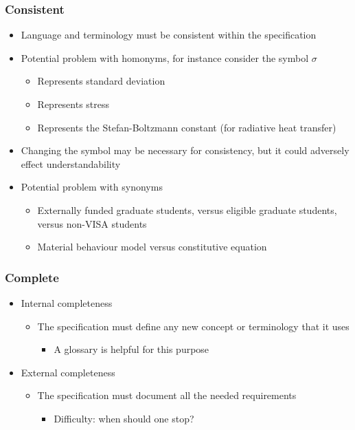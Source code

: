 \documentclass[t,12pt,numbers,fleqn]{beamer}
\begin{document}
\begin{frame}
\frametitle{Consistent}

\begin{itemize}

\item Language and terminology must be consistent within the specification
\item Potential problem with homonyms, for instance consider the symbol $\sigma$
\begin{itemize}
\item Represents standard deviation
\item Represents stress
\item Represents the Stefan-Boltzmann constant (for radiative heat transfer)
\end{itemize}
\item Changing the symbol may be necessary for consistency, but it could adversely effect understandability
\item Potential problem with synonyms
\begin{itemize}
\item Externally funded graduate students, versus eligible graduate students, versus non-VISA students
\item Material behaviour model versus constitutive equation
\end{itemize}
\end{itemize}

\end{frame}


\begin{frame}
\frametitle{Complete}

\begin{itemize}

\item Internal completeness
\begin{itemize}
\item The specification must define any new concept or terminology that it uses
\begin{itemize}
\item A glossary is helpful for this purpose
\end{itemize}
\end{itemize}
\item External completeness
\begin{itemize}
\item The specification must document all the needed requirements
\begin{itemize}
\item Difficulty: when should one stop?
\end{itemize}
\end{itemize}

\end{itemize}

\end{frame}
\end{document}
